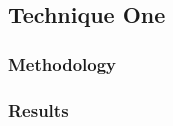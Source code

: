 
\subsection{Technique One}
\label{subsec:2.3_datdist_tech1}

\subsubsection{Methodology}

\subsubsection{Results}


